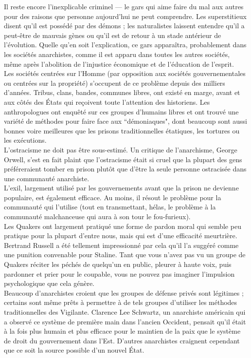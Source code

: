 Il reste encore l'inexplicable criminel --- le gars qui aime faire du mal aux autres pour des raisons que personne aujourd'hui ne peut comprendre. Les superstitieux disent qu'il est possédé par des démons ; les naturalistes laissent entendre qu'il a peut-être de mauvais gènes ou qu'il est de retour à un stade antérieur de l'évolution. Quelle qu'en soit l'explication, ce gars apparaîtra, probablement dans les sociétés anarchistes, comme il est apparu dans toutes les autres sociétés, même après l'abolition de l'injustice économique et de l'éducation de l'esprit.\\
Les sociétés centrées sur l'Homme (par opposition aux sociétés gouvernementales ou centrées sur la propriété) s'occupent de ce problème depuis des milliers d'années. Tribus, clans, bandes, communes libres, ont existé en marge, avant et aux côtés des États qui reçoivent toute l'attention des historiens. Les anthropologues ont enquêté sur ces groupes d'humains libres et ont trouvé une variété de méthodes pour faire face aux ``démoniaques", dont beaucoup sont aussi bonnes voire meilleures que les prisons traditionnelles étatiques, les tortures ou les exécutions.\\
L'ostracisme ne doit pas être sous-estimé. Un critique de l'anarchisme, George Orwell, s'est en fait plaint que l'ostracisme était si cruel que la plupart des gens préféreraient tomber en prison plutôt que d'être la seule personne ostracisée dans une communauté anarchiste.\\
L'exil, largement utilisé par les gouvernements avant que la prison ne devienne populaire, est également efficace. Au moins, il résout le problème pour la communauté qui l'utilise (tout en transmettant, hélas, le problème à la communauté malchanceuse qui aura à son tour le fou-furieux).\\
Les Quakers ont largement pratiqué une forme de pardon moral qui semble peu pratique pour la plupart d'entre nous, mais qui est d'une efficacité meurtrière. Bertrand Russell a été tellement impressionné par cela qu'il l'a suggéré comme une punition convenable pour Staline. Tant que vous n'avez pas vu un groupe de Quakers réciter les péchés de quelqu'un en public, pleurer à haute voix, puis pardonner et prier pour le coupable, vous ne pouvez pas imaginer l'impulsion psychologique que cela génère.\\
Beaucoup d'anarchistes croient que les groupes de défense privés sont légitimes ; certains sont même prêts à permettre à de tels groupes d'utiliser les méthodes traditionnelles des Vigilante. Clarence Lee Schwartz, un anarchiste américain qui a observé ce système de première main dans l'ancien Occident, pensait qu'il était à la fois plus humain et plus efficace pour le maintien de la paix que le système de droit du gouvernement dans l'Est. D'autres anarchistes craignent cependant que ce soit la source possible d'un nouvel État.\\
